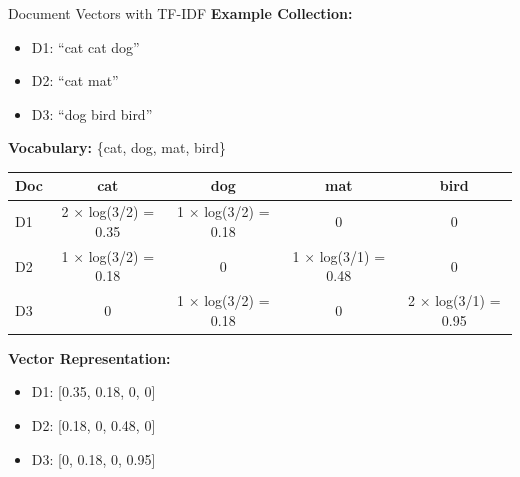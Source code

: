 \documentclass[aspectratio=169]{beamer}
\newif\ifanimated
\newcommand{\cpause}{\ifanimated\pause\fi}
\begin{document}
\begin{frame}[shrink=10]{Document Vectors with TF-IDF}
\textbf{Example Collection:}
\begin{itemize}
    \item D1: ``cat cat dog''
    \item D2: ``cat mat''
    \item D3: ``dog bird bird''
\end{itemize}
\cpause
\vspace{1em}

\textbf{Vocabulary:} \{cat, dog, mat, bird\}

\vspace{1em}

\begin{table}
\centering
\small
\begin{tabular}{lcccc}
\toprule
\textbf{Doc} & \textbf{cat} & \textbf{dog} & \textbf{mat} & \textbf{bird} \\
\midrule
D1 & 2 × log(3/2) = 0.35 & 1 × log(3/2) = 0.18 & 0 & 0 \\
D2 & 1 × log(3/2) = 0.18 & 0 & 1 × log(3/1) = 0.48 & 0 \\
D3 & 0 & 1 × log(3/2) = 0.18 & 0 & 2 × log(3/1) = 0.95 \\
\bottomrule
\end{tabular}
\end{table}

\vspace{1em}

\textbf{Vector Representation:}
\begin{itemize}
    \item D1: [0.35, 0.18, 0, 0]
    \item D2: [0.18, 0, 0.48, 0]
    \item D3: [0, 0.18, 0, 0.95]
\end{itemize}
\end{frame}
\end{document}
